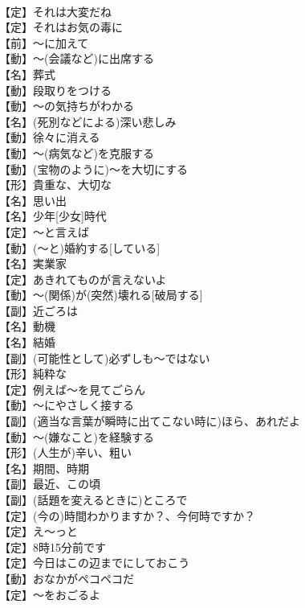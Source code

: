 \documentclass[8pt]{extreport}
\begin{document}
\begin{CJK}{UTF8}{min}
\\	【定】それは大変だね
\\	【定】それはお気の毒に
\\	【前】～に加えて
\\	【動】～(会議など)に出席する
\\	【名】葬式
\\	【動】段取りをつける
\\	【動】～の気持ちがわかる
\\	【名】(死別などによる)深い悲しみ
\\	【動】徐々に消える
\\	【動】～(病気など)を克服する
\\	【動】(宝物のように)～を大切にする
\\	【形】貴重な、大切な
\\	【名】思い出
\\	【名】少年[少女]時代
\\	【定】～と言えば
\\	【動】(～と)婚約する[している]
\\	【名】実業家
\\	【定】あきれてものが言えないよ
\\	【動】～(関係)が(突然)壊れる[破局する]
\\	【副】近ごろは
\\	【名】動機
\\	【名】結婚
\\	【副】(可能性として)必ずしも～ではない
\\	【形】純粋な
\\	【定】例えば～を見てごらん
\\	【動】～にやさしく接する
\\	【副】(適当な言葉が瞬時に出てこない時に)ほら、あれだよ
\\	【動】～(嫌なこと)を経験する
\\	【形】(人生が)辛い、粗い
\\	【名】期間、時期
\\	【副】最近、この頃
\\	【副】(話題を変えるときに)ところで
\\	【定】(今の)時間わかりますか？、今何時ですか？
\\	【定】え～っと
\\	【定】8時15分前です
\\	【定】今日はこの辺までにしておこう
\\	【動】おなかがペコペコだ
\\	【定】～をおごるよ
\end{CJK}
\end{document}
